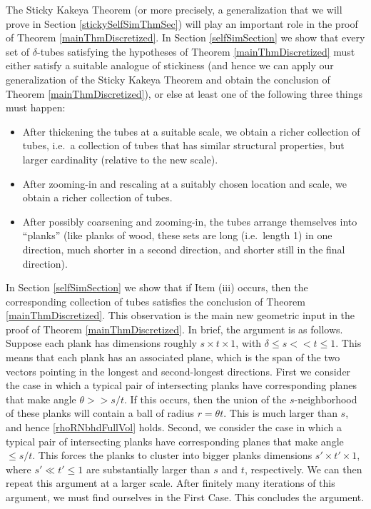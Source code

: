 \documentclass[letterpaper, reqno,11pt]{article}
\numberwithin{equation}{section}
\numberwithin{thm}{section}
\theoremstyle{remark}
\begin{document}
The Sticky Kakeya Theorem (or more precisely, a generalization that we will prove in Section \ref{stickySelfSimThmSec}) will play an important role in the proof of Theorem \ref{mainThmDiscretized}. In Section \ref{selfSimSection} we show that every set of $\delta$-tubes satisfying the hypotheses of Theorem \ref{mainThmDiscretized} must either satisfy a suitable analogue of stickiness (and hence we can apply our generalization of the Sticky Kakeya Theorem and obtain the conclusion of Theorem \ref{mainThmDiscretized}), or else at least one of the following three things must happen: 
\begin{itemize}
	\item[(i)] After thickening the tubes at a suitable scale, we obtain a richer collection of tubes, i.e.~a collection of tubes that has similar structural properties, but larger cardinality (relative to the new scale). 
	\item [(ii)] After zooming-in and rescaling at a suitably chosen location and scale, we obtain a richer collection of tubes. 
	\item[(iii)] After possibly coarsening and zooming-in, the tubes arrange themselves into ``planks'' (like planks of wood, these sets are long (i.e.~length 1) in one direction, much shorter in a second direction, and shorter still in the final direction). 
\end{itemize}

In Section \ref{selfSimSection} we show that if Item (iii) occurs, then the corresponding collection of tubes satisfies the conclusion of Theorem \ref{mainThmDiscretized}. This observation is the main new geometric input in the proof of Theorem \ref{mainThmDiscretized}. In brief, the argument is as follows. Suppose each plank has dimensions roughly $s\times t\times 1$, with $\delta\leq s<\!\!<t\leq 1$. This means that each plank has an associated plane, which is the span of the two vectors pointing in the longest and second-longest directions.  First we consider the case in which a typical pair of intersecting planks have corresponding planes that make angle $\theta>\!\!>s/t$. If this occurs, then the union of the $s$-neighborhood of these planks will contain a ball of radius $r=\theta t.$ This is much larger than $s$, and hence \eqref{rhoRNbhdFullVol} holds. Second, we consider the case in which a typical pair of intersecting planks have corresponding planes that make angle $\leq s/t$. This forces the planks to cluster into bigger planks dimensions $s'\times t'\times 1$, where $s' \ll t'\leq 1$ are substantially larger than $s$ and $t$, respectively. We can then repeat this argument at a larger scale. After finitely many iterations of this argument, we must find ourselves in the First Case. This concludes the argument. 
\end{document}
